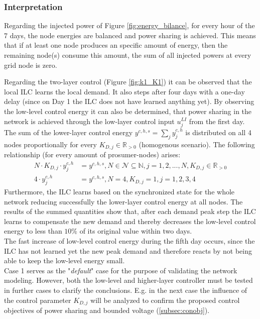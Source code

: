 \subsubsection*{Interpretation}
Regarding the injected power of Figure \ref{fig:energy_bilance}, for every hour of the 7 days, the node energies are balanced and power sharing is achieved. This means that if at least one node produces an specific amount of energy, then the remaining node(s) consume this amount, the sum of all injected powers at every grid node is zero. 

Regarding the two-layer control (Figure \ref{fig:k1_K1}) it can be observed that the local ILC learns the local demand. It also steps after four days with a one-day delay (since on Day 1 the ILC does not have learned anything yet). By observing the low-level control energy it can also be determined, that power sharing in the network is achieved through the low-layer control input $u_j^{LI}$ from the first day. The sum of the lower-layer control energy $y^{c,h,s} = \sum_{j}y^{c,h}_j$ is distributed on all 4 nodes proportionally for every $K_{D,j} \in \mathbb{R}_{>0}$ (homogenous scenario).
The following relationship (for every amount of prosumer-nodes) arises:
\begin{align}
N \cdot K_{D,j} \cdot y^{c,h}_j &= y^{c,h,s}, N \in \mathcal{N} \subseteq \mathbb{N}, j={1,2,...,N}, K_{D,j} \in \mathbb{R}_{>0} \label{eq:sum_energy_hom} \\
4 \cdot y^{c,h}_j &= y^{c,h,s} ,N=4, K_{D,j}=1, j=1,2,3,4 \nonumber
\end{align}
Furthermore, the ILC learns based on the synchronized state for the whole network reducing successfully the lower-layer control energy at all nodes. The results of the summed quantities show that, after each demand peak step the ILC learns to compensate the new demand and thereby decreases the low-level control energy to less than $10\%$ of its original value within two days.
\\The fast increase of low-level control energy during the fifth day occurs, since the ILC has not learned yet the new peak demand and therefore reacts by not being able to keep the low-level energy small.
\\Case 1 serves as the "\textit{default}" case for the purpose of validating the network modeling. However, both the low-level and higher-layer controller must be tested in further cases to clarify the conclusions. E.g. in the next case the influence of the control parameter $K_{D,j}$ will be analyzed to confirm the proposed control objectives of power sharing and bounded voltage (\ref{subsec:conobj}).
